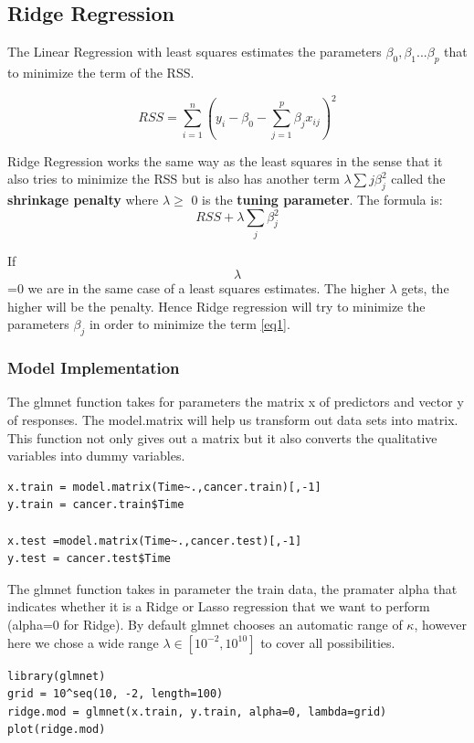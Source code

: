 \documentclass[]{report}
\begin{document}
\subsection{Ridge Regression}
The Linear Regression with least squares estimates the parameters $\beta_{0},\beta_{1}...\beta_{p}$ that to minimize the term of the RSS.
\begin{center}
	$$ RSS = \sum_{i=1}^{n}(y_{i} - \beta_{0} - \sum_{j=1}^{p}\beta_{j}x_{ij})^{2} $$
\end{center}

Ridge Regression works the same way as the least squares in the sense that it also tries to minimize the RSS but is also has another term $\lambda \sum{j}\beta_{j}^{2}$ called the \textbf{shrinkage penalty} where $\lambda\geq$ 0 is the \textbf{ tuning parameter}. The formula is:
		\begin{equation} \label{eq1}
		  RSS + \lambda \sum_{j}\beta_{j}^{2}
		\end{equation}			

If $$\lambda$$=0 we are in the same case of a least squares estimates. The higher $\lambda$ gets, the higher will be the penalty. Hence Ridge regression will try to minimize the parameters $\beta_{j}$ in order to minimize the term \ref{eq1}.\\
\subsubsection{Model Implementation}
The glmnet function takes for parameters the matrix x of predictors and vector y of responses. The model.matrix will help us transform out data sets into matrix. This function not only gives out a matrix but it also converts the qualitative variables into dummy variables.
\begin{lstlisting}
x.train = model.matrix(Time~.,cancer.train)[,-1] 
y.train = cancer.train$Time

x.test =model.matrix(Time~.,cancer.test)[,-1]
y.test = cancer.test$Time
\end{lstlisting}
The glmnet function takes in parameter the train data, the pramater alpha that indicates whether it is a Ridge or Lasso regression that we want to perform (alpha=0 for Ridge). By default glmnet chooses an automatic range of $\kappa$, however here we chose a wide range $\lambda\in[10^{−2},10^{10}]$ to cover all possibilities.

\begin{lstlisting}
library(glmnet)
grid = 10^seq(10, -2, length=100)
ridge.mod = glmnet(x.train, y.train, alpha=0, lambda=grid)
plot(ridge.mod)
\end{lstlisting}
\end{document}
